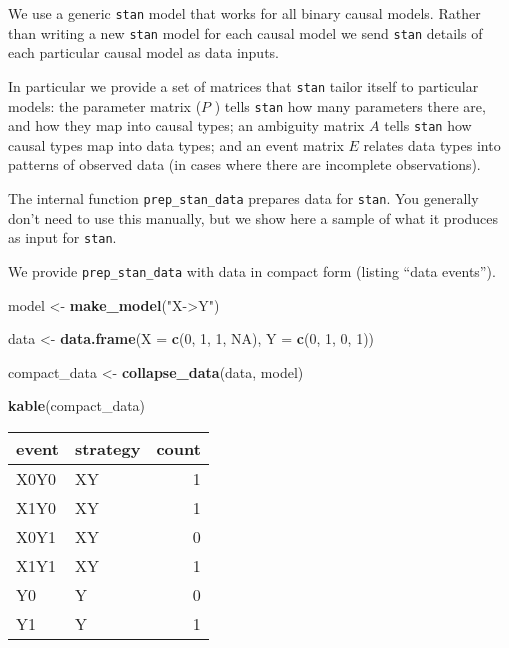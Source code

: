 \documentclass[
  12pt,
]{book}
\newenvironment{Shaded}{\begin{snugshade}}{\end{snugshade}}
\newcommand{\DataTypeTok}[1]{\textcolor[rgb]{0.13,0.29,0.53}{#1}}
\newcommand{\DecValTok}[1]{\textcolor[rgb]{0.00,0.00,0.81}{#1}}
\newcommand{\KeywordTok}[1]{\textcolor[rgb]{0.13,0.29,0.53}{\textbf{#1}}}
\newcommand{\NormalTok}[1]{#1}
\newcommand{\OtherTok}[1]{\textcolor[rgb]{0.56,0.35,0.01}{#1}}
\newcommand{\StringTok}[1]{\textcolor[rgb]{0.31,0.60,0.02}{#1}}
\begin{document}
We use a generic \texttt{stan} model that works for all binary causal models. Rather than writing a new \texttt{stan} model for each causal model we send \texttt{stan} details of each particular causal model as data inputs.

In particular we provide a set of matrices that \texttt{stan} tailor itself to particular models: the parameter matrix (\(P\) ) tells \texttt{stan} how many parameters there are, and how they map into causal types; an ambiguity matrix \(A\) tells \texttt{stan} how causal types map into data types; and an event matrix \(E\) relates data types into patterns of observed data (in cases where there are incomplete observations).

The internal function \texttt{prep\_stan\_data} prepares data for \texttt{stan}. You generally don't need to use this manually, but we show here a sample of what it produces as input for \texttt{stan}.

We provide \texttt{prep\_stan\_data} with data in compact form (listing ``data events'').

\begin{Shaded}
\begin{Highlighting}[]
\NormalTok{model <-}\StringTok{ }\KeywordTok{make_model}\NormalTok{(}\StringTok{"X->Y"}\NormalTok{)}

\NormalTok{data  <-}\StringTok{ }\KeywordTok{data.frame}\NormalTok{(}\DataTypeTok{X =} \KeywordTok{c}\NormalTok{(}\DecValTok{0}\NormalTok{, }\DecValTok{1}\NormalTok{, }\DecValTok{1}\NormalTok{, }\OtherTok{NA}\NormalTok{), }\DataTypeTok{Y =} \KeywordTok{c}\NormalTok{(}\DecValTok{0}\NormalTok{, }\DecValTok{1}\NormalTok{, }\DecValTok{0}\NormalTok{, }\DecValTok{1}\NormalTok{)) }

\NormalTok{compact_data <-}\StringTok{  }\KeywordTok{collapse_data}\NormalTok{(data, model) }

\KeywordTok{kable}\NormalTok{(compact_data)}
\end{Highlighting}
\end{Shaded}

\begin{tabular}{l|l|r}
\hline
event & strategy & count\\
\hline
X0Y0 & XY & 1\\
\hline
X1Y0 & XY & 1\\
\hline
X0Y1 & XY & 0\\
\hline
X1Y1 & XY & 1\\
\hline
Y0 & Y & 0\\
\hline
Y1 & Y & 1\\
\hline
\end{tabular}
\end{document}
